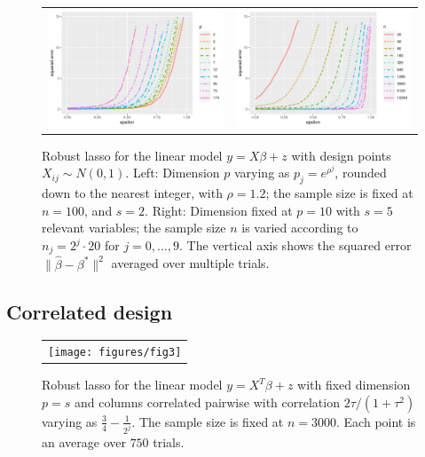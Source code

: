 \begin{figure}[t]
\vskip20pt
  \begin{center}
    \begin{tabular}{cc}
      \hskip-10pt
      \includegraphics[width=.48\textwidth]{figures/fig2a}&
      \includegraphics[width=.48\textwidth]{figures/fig2b}\\[-5pt]
    \end{tabular}
  \end{center}
\caption{Robust lasso for the linear model  $y=X\beta + z$ with design points $X_{ij}\sim N(0,1)$.
Left: Dimension $p$ varying as $p_{j} = e^{\rho^j}$, rounded down to the nearest integer, with $\rho=1.2$; the sample size is fixed at $n=100$, and $s=2$. Right: Dimension fixed at $p=10$ with $s=5$ relevant variables; the sample size $n$ is varied according to
$n_j = 2^j \cdot 20$ for $j=0,\ldots, 9$. The vertical axis shows the squared error $\|\hat \beta - \beta^*\|^2$ averaged over multiple trials.}
\label{fig:exp1}
\end{figure}

\subsection{Correlated design}

\begin{figure}[ht]
  \vskip20pt
    \begin{center}
      \begin{tabular}{c}
        \texttt{[image: figures/fig3]}
      \end{tabular}
    \end{center}
  \caption{Robust lasso for the linear model  $y=X^T\beta + z$ with 
  fixed dimension $p = s$ and columns correlated pairwise with correlation 
  $2\tau/(1+\tau^2)$ varying as $\frac{3}{4} - \frac{1}{2^j}$. The sample size is fixed at $n=3000$. Each point is an average over $750$ trials.}
  \label{fig:corr}
  \end{figure}
  
